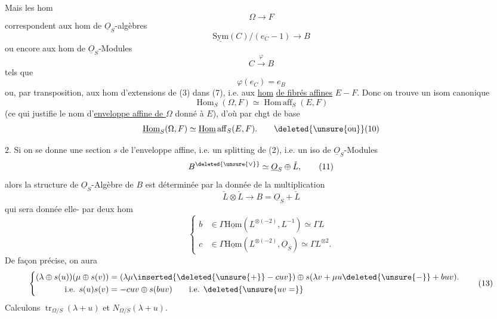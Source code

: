 Mais les hom
\[
\Omega\longrightarrow F
\]
correspondent aux hom de $\underline{O}_S$-algèbres
\[
\underline{\mathrm{Sym}}(C)/(e_C-1)\longrightarrow B
\]
ou encore aux hom de $\underline{O}_S$-Modules
\[
C\xrightarrow{\varphi}B
\]
tels que
\[
\varphi(e_C)=e_B
\]
ou, par transposition, aux hom d'extensions de
(3) dans (7), i.e. aux \uline{hom} \uline{de fibrés affines}
$E\mathbin{-}F$. Donc on trouve un isom canonique
\[
\operatorname{Hom}_S(\Omega,F)\simeq\operatorname{Hom\,aff}_S(E,F) \tag*{(9)}
\]
(ce qui justifie le nom d'\uline{enveloppe affine de $\Omega$}
donné à $E$), d'où par chgt de base
\[
\underline{\mathrm{Hom}}_S(\Omega,F)\simeq\underline{\mathrm{Hom}}\,\mathrm{aff}_S(E,F).\tag*{\deleted{\unsure{ou}}(10)}
\]


2. Si on se donne une section $s$ de l'enveloppe affine, i.e. un splitting de (2), i.e.
un iso de $\underline{O}_S$-Modules
\[
B^{\deleted{\unsure{\vee}}}\simeq\underline{O}_S\oplus\check L,\tag*{(11)}
\]
alors la structure de $\underline{O}_S$-Algèbre de $B$ est déterminée
par la donnée de la multiplication
\[
\check L\otimes\check L\longrightarrow B=\underline{O}_S+\check L
\]
qui sera donnée elle- par deux hom
\[
\left\{\begin{aligned}
b&\in\Gamma\underline{\mathrm{Hom}}(L^{\otimes(-2)},L^{-1})\simeq\Gamma L\\
c&\in\Gamma\underline{\mathrm{Hom}}(L^{\otimes(-2)},\underline{O}_S)\simeq\Gamma L^{\otimes2}.
\end{aligned}\right. \tag*{(12)}
\]
De façon précise, on aura
\[
\left\{\begin{aligned}
(\lambda\oplus s(u))(\mu\oplus s(v))&=(\lambda\mu\inserted{\deleted{\unsure{+}}-cuv})\oplus s(\lambda v+\mu u\deleted{\unsure{-}}+buv).\\
\text{i.e. }s(u)s(v)&=-cuv\oplus s(buv)\qquad\text{i.e. }\deleted{\unsure{uv=}}
\end{aligned}\right. \tag*{(13)}
\]
 Calculons $\operatorname{tr}_{\Omega/S}(\lambda+u)$ et $N_{\Omega/S}(\lambda+u)$.

